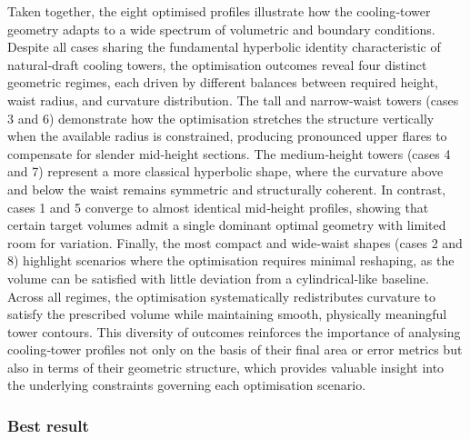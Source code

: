 Taken together, the eight optimised profiles illustrate how the cooling‑tower geometry adapts to a wide spectrum of volumetric and boundary conditions. Despite all cases sharing the fundamental hyperbolic identity characteristic of natural‑draft cooling towers, the optimisation outcomes reveal four distinct geometric regimes, each driven by different balances between required height, waist radius, and curvature distribution. The tall and narrow‑waist towers (cases 3 and 6) demonstrate how the optimisation stretches the structure vertically when the available radius is constrained, producing pronounced upper flares to compensate for slender mid‑height sections. The medium‑height towers (cases 4 and 7) represent a more classical hyperbolic shape, where the curvature above and below the waist remains symmetric and structurally coherent. In contrast, cases 1 and 5 converge to almost identical mid‑height profiles, showing that certain target volumes admit a single dominant optimal geometry with limited room for variation. Finally, the most compact and wide‑waist shapes (cases 2 and 8) highlight scenarios where the optimisation requires minimal reshaping, as the volume can be satisfied with little deviation from a cylindrical‑like baseline. Across all regimes, the optimisation systematically redistributes curvature to satisfy the prescribed volume while maintaining smooth, physically meaningful tower contours. This diversity of outcomes reinforces the importance of analysing cooling‑tower profiles not only on the basis of their final area or error metrics but also in terms of their geometric structure, which provides valuable insight into the underlying constraints governing each optimisation scenario.

\subsubsection{Best result}

